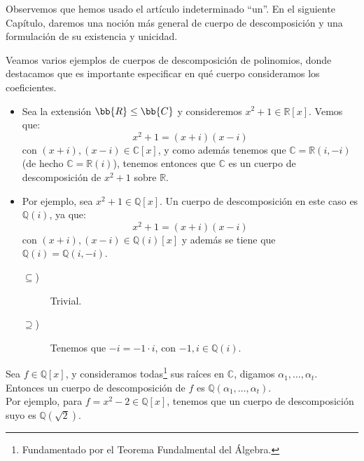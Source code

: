 Observemos que hemos usado el artículo indeterminado ``un''. En el siguiente Capítulo, daremos una noción más general de cuerpo de descomposición y una formulación de su existencia y unicidad.

\begin{ejemplo}
    Veamos varios ejemplos de cuerpos de descomposición de polinomios, donde destacamos que es importante especificar en qué cuerpo consideramos los coeficientes.
    \begin{itemize}
        \item Sea la extensión $\bb{R}\leq \bb{C}$ y consideremos $x^2+1\in \mathbb{R}[x]$. Vemos que:
            \begin{equation*}
                x^2+1 = (x+i)(x-i)
            \end{equation*}
            con $(x+i),(x-i)\in \mathbb{C}[x]$, y como además tenemos que $\mathbb{C} = \mathbb{R}(i,-i)$ (de hecho $\mathbb{C} = \mathbb{R}(i)$), tenemos entonces que $\mathbb{C}$ es un cuerpo de descomposición de $x^2+1$ sobre $\mathbb{R}$.
        \item Por ejemplo, sea $x^2+1\in \mathbb{Q}[x]$. Un cuerpo de descomposición en este caso es $\mathbb{Q}(i)$, ya que:
            \begin{equation*}
                x^2+1 = (x+i)(x-i)
            \end{equation*}
            con $(x+i),(x-i)\in \mathbb{Q}(i)[x]$ y además se tiene que $\mathbb{Q}(i) = \mathbb{Q}(i,-i)$.
            \begin{description}
                \item [$\subseteq$)] Trivial.
                \item [$\supseteq$)] Tenemos que $-i = -1 \cdot i$, con $-1,i \in \mathbb{Q}(i)$.
            \end{description}
    \end{itemize}
\end{ejemplo}

\begin{observacion}
    Sea $f\in \mathbb{Q}[x]$, y consideramos todas\footnote{Fundamentado por el Teorema Fundalmental del Álgebra.} sus raíces en $\mathbb{C}$, digamos $\alpha_1,\ldots,\alpha_t$.  Entonces un cuerpo de descomposición de $f$ es $\mathbb{Q}(\alpha_1,\ldots,\alpha_t)$.\\

    \noindent
    Por ejemplo, para $f=x^2-2\in \mathbb{Q}[x]$, tenemos que un cuerpo de descomposición suyo es $\mathbb{Q}\left(\sqrt{2}\right)$.
\end{observacion}

